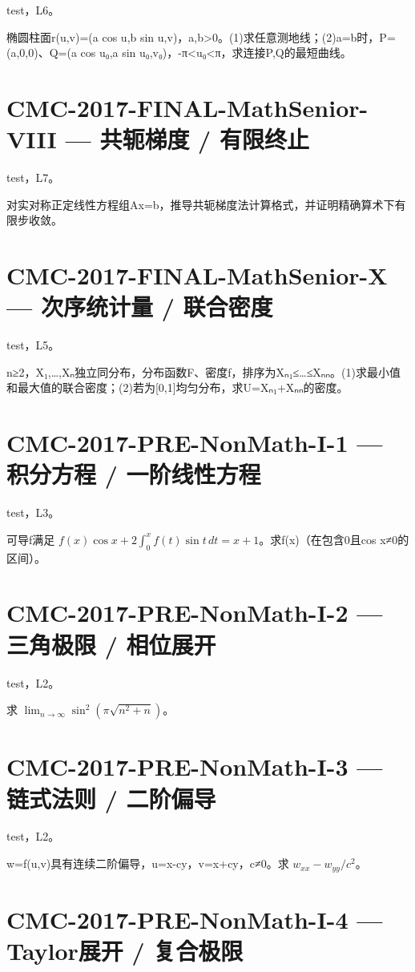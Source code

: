 \documentclass[UTF8]{ctexart}
\begin{document}
test，L6。

椭圆柱面r(u,v)=(a cos u,b sin u,v)，a,b>0。(1)求任意测地线；(2)a=b时，P=(a,0,0)、Q=(a cos u₀,a sin u₀,v₀)，-π<u₀<π，求连接P,Q的最短曲线。

\section*{CMC-2017-FINAL-MathSenior-VIII — 共轭梯度 / 有限终止}

test，L7。

对实对称正定线性方程组Ax=b，推导共轭梯度法计算格式，并证明精确算术下有限步收敛。

\section*{CMC-2017-FINAL-MathSenior-X — 次序统计量 / 联合密度}

test，L5。

n≥2，X₁,…,Xₙ独立同分布，分布函数F、密度f，排序为Xₙ₁≤…≤Xₙₙ。(1)求最小值和最大值的联合密度；(2)若为[0,1]均匀分布，求U=Xₙ₁+Xₙₙ的密度。

\section*{CMC-2017-PRE-NonMath-I-1 — 积分方程 / 一阶线性方程}

test，L3。

可导f满足 $f(x)\cos x+2\int_0^xf(t)\sin t\,dt=x+1$。求f(x)（在包含0且cos x≠0的区间）。

\section*{CMC-2017-PRE-NonMath-I-2 — 三角极限 / 相位展开}

test，L2。

求 $\lim_{n\to\infty}\sin^2(\pi\sqrt{n^2+n})$。

\section*{CMC-2017-PRE-NonMath-I-3 — 链式法则 / 二阶偏导}

test，L2。

w=f(u,v)具有连续二阶偏导，u=x-cy，v=x+cy，c≠0。求 $w_{xx}-w_{yy}/c^2$。

\section*{CMC-2017-PRE-NonMath-I-4 — Taylor展开 / 复合极限}
\end{document}
